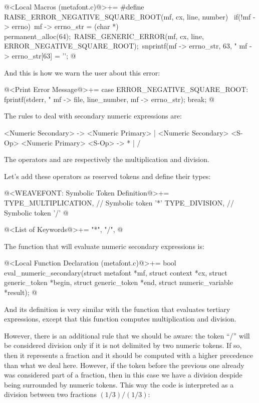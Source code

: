\iniciocodigo
@<Local Macros (metafont.c)@>+=
#define RAISE_ERROR_NEGATIVE_SQUARE_ROOT(mf, cx, line, number) {\
  if(!mf -> errno){\
    mf -> errno_str = (char *) permanent_alloc(64);\
    RAISE_GENERIC_ERROR(mf, cx, line, ERROR_NEGATIVE_SQUARE_ROOT);\
    snprintf(mf -> errno_str, 63, "%
    mf -> errno_str[63] = '\0';}}
@
\fimcodigo

And this is how we warn the user about this error:

\iniciocodigo
@<Print Error Message@>+=
case ERROR_NEGATIVE_SQUARE_ROOT:
  fprintf(stderr, "%
          mf -> file, line_number, mf -> errno_str);
  break;
@
\fimcodigo


The rules to deal with secondary numeric expressions are:

\alinhaverbatim
<Numeric Secondary> -> <Numeric Primary> |
                       <Numeric Secondary> <S-Op> <Numeric Primary>
<S-Op> -> * | /
\alinhanormal

The operators \monoespaco{*} and \monoespaco{/} are respectively the
multiplication and division.

Let's add these operators as reserved tokens and define their types:

\iniciocodigo
@<WEAVEFONT: Symbolic Token Definition@>+=
TYPE_MULTIPLICATION,        // Symbolic token '*'
TYPE_DIVISION,              // Symbolic token '/'
@
\fimcodigo

\iniciocodigo
@<List of Keywords@>+=
"*", "/",
@
\fimcodigo

The function that will evaluate numeric secondary expressions is:

\iniciocodigo
@<Local Function Declaration (metafont.c)@>+=
bool eval_numeric_secondary(struct metafont *mf, struct context *cx,
                             struct generic_token *begin,
                             struct generic_token *end,
                             struct numeric_variable *result);
@
\fimcodigo

And its definition is very similar with the function that evaluates
tertiary expressions, except that this function computes
multiplication and division.

However, there is an additional rule that we should be aware: the
token ``/'' will be considered division only if it is not delimited by
two numeric tokens. If so, then it represents a fraction and it should
be computed with a higher precedence than what we deal here. However,
if the token before the previous one already was considered part of a
fraction, then in this case we have a division despide being
surrounded by numeric tokens. This way the code \monoespaco{1/3/1/3}
is interpreted as a division between two fractions $(1/3)/(1/3)$:

